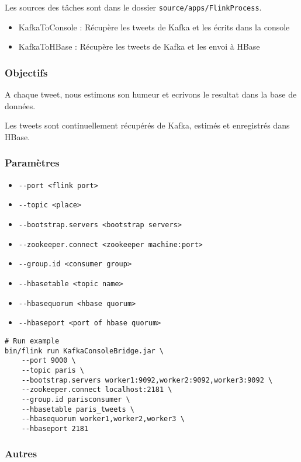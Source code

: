 \documentclass[a4paper,oneside,10pt]{article}
\begin{document}
Les sources des tâches sont dans le dossier \verb!source/apps/FlinkProcess!. 

\begin{itemize}
\item KafkaToConsole : Récupère les tweets de Kafka et les écrits dans la console
\item KafkaToHBase : Récupère les tweets de Kafka et les envoi à HBase
\end{itemize}

\subsubsection{Objectifs}

A chaque tweet, nous estimons son humeur et ecrivons le resultat dans la base de données. 

Les tweets sont continuellement récupérés de Kafka, estimés et enregistrés dans HBase. 

\subsubsection{Paramètres}

\begin{itemize}
\item \verb!--port <flink port>! 
\item \verb!--topic <place>!
\item \verb!--bootstrap.servers <bootstrap servers>!
\item \verb!--zookeeper.connect <zookeeper machine:port>!
\item \verb!--group.id <consumer group>!
\item \verb!--hbasetable <topic name>!
\item \verb!--hbasequorum <hbase quorum>!
\item \verb!--hbaseport <port of hbase quorum>!
\end{itemize}

\begin{verbatim}
# Run example
bin/flink run KafkaConsoleBridge.jar \
	--port 9000 \
	--topic paris \
	--bootstrap.servers worker1:9092,worker2:9092,worker3:9092 \
	--zookeeper.connect localhost:2181 \
	--group.id parisconsumer \
	--hbasetable paris_tweets \
	--hbasequorum worker1,worker2,worker3 \
	--hbaseport 2181
\end{verbatim}

\subsubsection{Autres}
\end{document}
